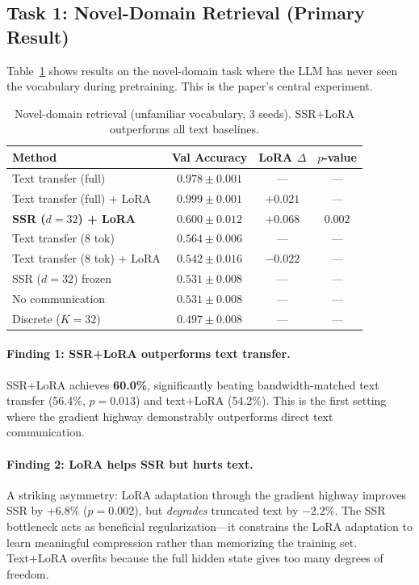\documentclass[11pt,a4paper]{article}
\begin{document}
\subsection{Task 1: Novel-Domain Retrieval (Primary Result)}

Table~\ref{tab:novel} shows results on the novel-domain task where the LLM has never seen the vocabulary during pretraining. This is the paper's central experiment.

\begin{table}[h]
\centering
\caption{Novel-domain retrieval (unfamiliar vocabulary, 3 seeds). SSR+LoRA outperforms all text baselines.}
\label{tab:novel}
\vspace{0.3em}
\begin{tabular}{@{}lccc@{}}
\toprule
\textbf{Method} & \textbf{Val Accuracy} & \textbf{LoRA $\Delta$} & \textbf{$p$-value} \\
\midrule
Text transfer (full)        & $0.978 \pm 0.001$ & --- & --- \\
Text transfer (full) + LoRA & $0.999 \pm 0.001$ & $+0.021$ & --- \\
\midrule
\textbf{SSR ($d{=}32$) + LoRA} & $\mathbf{0.600 \pm 0.012}$ & $\mathbf{+0.068}$ & $0.002$ \\
Text transfer (8 tok)       & $0.564 \pm 0.006$ & --- & --- \\
Text transfer (8 tok) + LoRA & $0.542 \pm 0.016$ & $-0.022$ & --- \\
SSR ($d{=}32$) frozen       & $0.531 \pm 0.008$ & --- & --- \\
No communication            & $0.531 \pm 0.008$ & --- & --- \\
Discrete ($K{=}32$)         & $0.497 \pm 0.008$ & --- & --- \\
\bottomrule
\end{tabular}
\end{table}

\paragraph{Finding 1: SSR+LoRA outperforms text transfer.}
SSR+LoRA achieves \textbf{60.0\%}, significantly beating bandwidth-matched text transfer (56.4\%, $p{=}0.013$) and text+LoRA (54.2\%). This is the first setting where the gradient highway demonstrably outperforms direct text communication.

\paragraph{Finding 2: LoRA helps SSR but hurts text.}
A striking asymmetry: LoRA adaptation through the gradient highway improves SSR by +6.8\% ($p{=}0.002$), but \emph{degrades} truncated text by $-2.2\%$. The SSR bottleneck acts as beneficial regularization---it constrains the LoRA adaptation to learn meaningful compression rather than memorizing the training set. Text+LoRA overfits because the full hidden state gives too many degrees of freedom.
\end{document}
